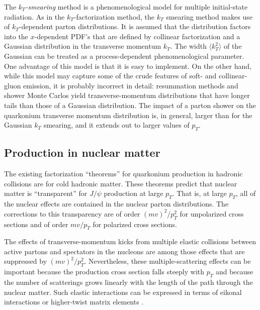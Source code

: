The {\it $k_T$-smearing} method is a phenomenological model for multiple
initial-state radiation.  As in the $k_T$-factorization method, the
$k_T$ smearing method makes use of $k_T$-dependent parton distributions.
It is assumed that the distribution factors into the $x$-dependent PDF's
that are defined by collinear factorization and a Gaussian distribution
in the transverse momentum $k_T$.  The width $\langle k_T^2 \rangle$ of
the Gaussian can be treated as a process-dependent phenomenological
parameter.  One advantage of this model is that it is easy to implement.
On the other hand, while this model may capture some of the crude
features of soft- and collinear-gluon emission, it is probably incorrect
in detail: resummation methods and shower Monte Carlos
yield transverse-momentum distributions that have longer tails than
those of a Gaussian distribution. The impact of a parton shower on the
quarkonium transverse momentum distribution is, in general, larger than
for the Gaussian $k_T$ smearing, and it extends out to larger values of 
$p_T$.


\subsection{Production in nuclear matter}
\label{prodsec:nrqcdnuc}

The existing factorization ``theorems'' for quarkonium production in
hadronic collisions are for cold hadronic matter. These theorems predict
that nuclear matter is ``transparent'' for $J/\psi$ production at large
$p_T$. That is, at large $p_T$, all of the nuclear effects are contained
in the nuclear parton distributions. The corrections to this
transparency are of order $(mv)^2/p_T^2$ for unpolarized cross
sections and of order $mv/p_T$ for polarized cross sections.

The effects of transverse-momentum kicks from multiple elastic
collisions between active partons and spectators in the nucleons are
among those effects that are suppressed by $(mv)^2/p_T^2$. Nevertheless,
these multiple-scattering effects can be important because the
production cross section falls steeply with $p_T$ and because the number
of scatterings grows linearly with the length of the path through the
nuclear matter. Such elastic interactions can be expressed in terms of
eikonal interactions \cite{Bodwin:1988fs} or higher-twist matrix
elements \cite{Qiu:2001hj}.

